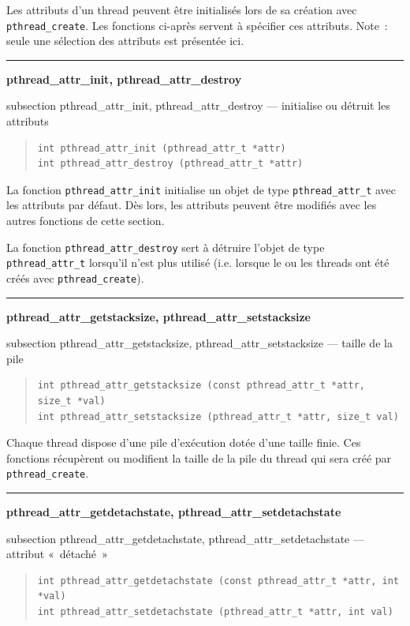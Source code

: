 \documentclass [twoside] {report}
\newcommand {\primitive} [1]
    {
	\phantomsection
	{\large \textbf {#1}}
	\addcontentsline {toc} {subsection} {#1}
    }
\newcommand {\separation}
    {
	\vspace {5mm}
	\nopagebreak
	\hrule
    }
\begin{document}
Les attributs d'un thread peuvent être initialisés lors de sa création
avec \verb|pthread_create|. Les fonctions ci-après servent à spécifier
ces attributs.
Note~: seule une sélection des attributs est présentée ici.


\separation
\primitive {pthread\_attr\_init, pthread\_attr\_destroy} --- initialise ou détruit les attributs

\begin {quote}
\begin {verbatim}
int pthread_attr_init (pthread_attr_t *attr)
int pthread_attr_destroy (pthread_attr_t *attr)
\end{verbatim}
\end {quote}

La fonction \verb|pthread_attr_init| initialise un objet de type
\verb|pthread_attr_t| avec les attributs par défaut. Dès lors, les
attributs peuvent être modifiés avec les autres fonctions de cette
section.

La fonction \verb|pthread_attr_destroy| sert à détruire l'objet de type
\verb|pthread_attr_t| lorsqu'il n'est plus utilisé (i.e.  lorsque le
ou les threads ont été créés avec \verb|pthread_create|).


\separation
\primitive {pthread\_attr\_getstacksize, pthread\_attr\_setstacksize} --- taille de la pile

\begin {quote}
\begin {verbatim}
int pthread_attr_getstacksize (const pthread_attr_t *attr, size_t *val)
int pthread_attr_setstacksize (pthread_attr_t *attr, size_t val)
\end{verbatim}
\end {quote}

Chaque thread dispose d'une pile d'exécution dotée d'une taille
finie. Ces fonctions récupèrent ou modifient la taille de la pile
du thread qui sera créé par \verb|pthread_create|.


\separation
\primitive {pthread\_attr\_getdetachstate,
pthread\_attr\_setdetachstate} --- attribut «~détaché~»

\begin {quote}
\begin {verbatim}
int pthread_attr_getdetachstate (const pthread_attr_t *attr, int *val)
int pthread_attr_setdetachstate (pthread_attr_t *attr, int val)
\end{verbatim}
\end {quote}
\end{document}
